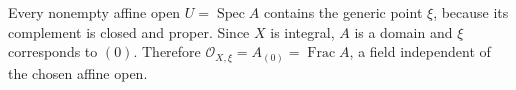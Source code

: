 Every nonempty affine open $U=\operatorname{Spec}A$ contains the generic point $\xi$, because its complement is closed and proper. Since $X$ is integral, $A$ is a domain and $\xi$ corresponds to $(0)$. Therefore $\mathcal O_{X,\xi}=A_{(0)}=\operatorname{Frac}A$, a field independent of the chosen affine open.
